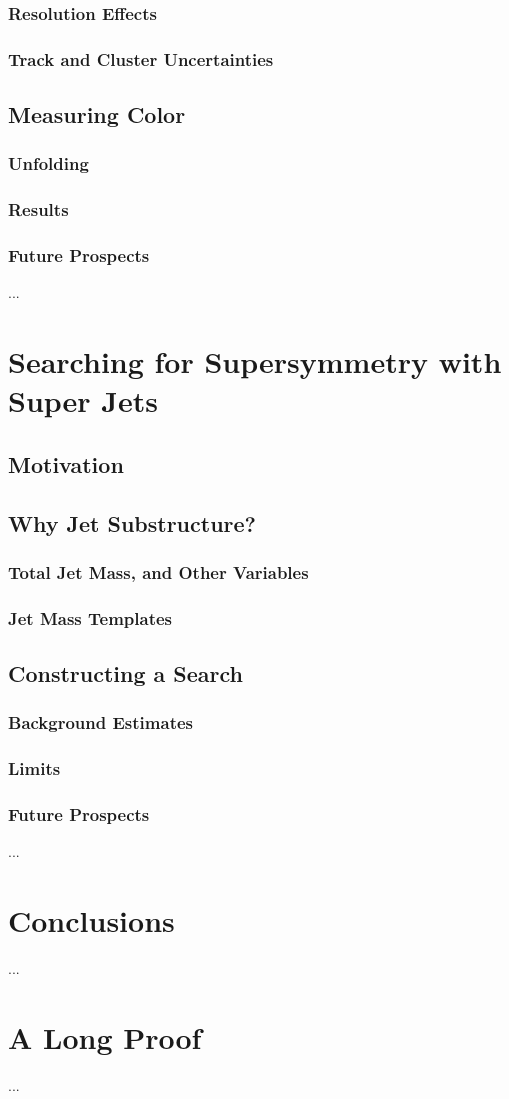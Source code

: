 \documentclass{report}
\begin{document}
	\subsection{Resolution Effects}
	\subsection{Track and Cluster Uncertainties}
\section{Measuring Color}
	\subsection{Unfolding}
	\subsection{Results}
	\subsection{Future Prospects}
		...

\chapter{Searching for Supersymmetry with Super Jets}
\section{Motivation}
\section{Why Jet Substructure?}
	\subsection{Total Jet Mass, and Other Variables}
	\subsection{Jet Mass Templates}
\section{Constructing a Search}
	\subsection{Background Estimates}
	\subsection{Limits}
	\subsection{Future Prospects}
		...


\chapter{Conclusions}
         ...
\appendix
\chapter{A Long Proof}
         ...


\end{document}
